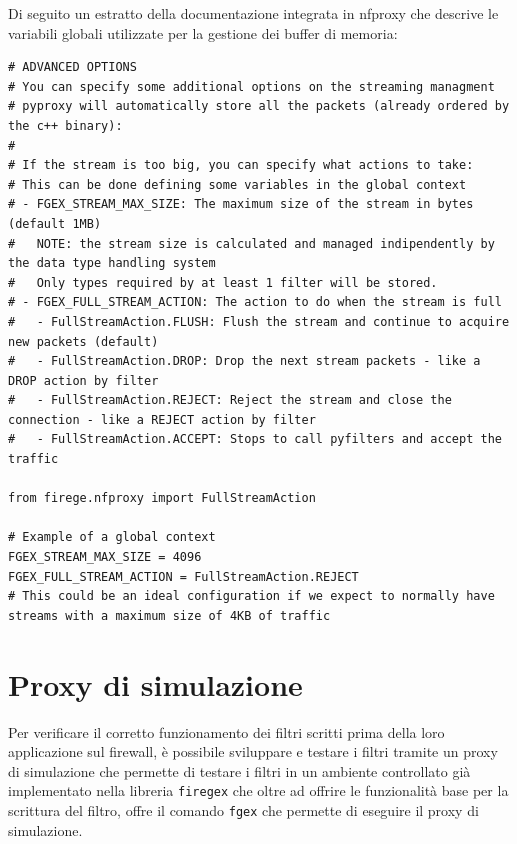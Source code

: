 Di seguito un estratto della documentazione integrata in nfproxy che descrive le variabili globali utilizzate per la gestione dei buffer di memoria:

\begin{listing}[H]
    \begin{verbatim}
# ADVANCED OPTIONS
# You can specify some additional options on the streaming managment
# pyproxy will automatically store all the packets (already ordered by the c++ binary):
#
# If the stream is too big, you can specify what actions to take:
# This can be done defining some variables in the global context
# - FGEX_STREAM_MAX_SIZE: The maximum size of the stream in bytes (default 1MB)
#   NOTE: the stream size is calculated and managed indipendently by the data type handling system
#   Only types required by at least 1 filter will be stored.
# - FGEX_FULL_STREAM_ACTION: The action to do when the stream is full
#   - FullStreamAction.FLUSH: Flush the stream and continue to acquire new packets (default)
#   - FullStreamAction.DROP: Drop the next stream packets - like a DROP action by filter
#   - FullStreamAction.REJECT: Reject the stream and close the connection - like a REJECT action by filter
#   - FullStreamAction.ACCEPT: Stops to call pyfilters and accept the traffic

from firege.nfproxy import FullStreamAction

# Example of a global context
FGEX_STREAM_MAX_SIZE = 4096
FGEX_FULL_STREAM_ACTION = FullStreamAction.REJECT
# This could be an ideal configuration if we expect to normally have streams with a maximum size of 4KB of traffic
\end{verbatim}
\end{listing}

\section{Proxy di simulazione}

Per verificare il corretto funzionamento dei filtri scritti prima della loro applicazione sul firewall, è possibile
sviluppare e testare i filtri tramite un proxy di simulazione che permette di testare i filtri in un ambiente controllato
già implementato nella libreria \texttt{firegex} che oltre ad offrire le funzionalità base per la scrittura del filtro, offre
il comando \texttt{fgex} che permette di eseguire il proxy di simulazione.\\

